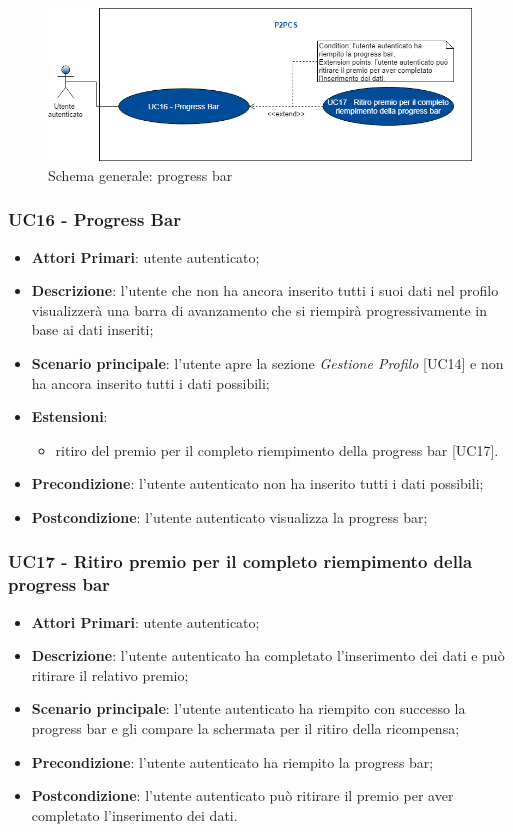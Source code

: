 \begin{figure}[h]
	\includegraphics[width=13cm]{res/images/Schemagenerale7.png}
	\centering
	\caption{Schema generale: progress bar}
\end{figure}
\subsubsection{UC16 - Progress Bar}
\begin{itemize}
	\item \textbf{Attori Primari}: utente autenticato;
	\item \textbf{Descrizione}: l'utente che non ha ancora inserito tutti i suoi dati nel profilo visualizzerà una barra di avanzamento che si riempirà progressivamente in base ai dati inseriti;
	\item \textbf{Scenario principale}: l'utente apre la sezione \textit{Gestione Profilo} [UC14] e non ha ancora inserito tutti i dati possibili;
	\item \textbf{Estensioni}:
	\begin{itemize}
		\item ritiro del premio per il completo riempimento della progress bar [UC17].
	\end{itemize}
	\item \textbf{Precondizione}: l'utente autenticato non ha inserito tutti i dati possibili;
	\item \textbf{Postcondizione}: l'utente autenticato visualizza la progress bar;	
\end{itemize}

\subsubsection{UC17 - Ritiro premio per il completo riempimento della progress bar}
\begin{itemize}
	\item \textbf{Attori Primari}: utente autenticato;
	\item \textbf{Descrizione}: l'utente autenticato ha completato l'inserimento dei dati e può ritirare il relativo premio;	
	\item \textbf{Scenario principale}: l'utente autenticato ha riempito con successo la progress bar e gli compare la schermata per il ritiro della ricompensa;
	\item \textbf{Precondizione}: l'utente autenticato ha riempito la progress bar;
	\item \textbf{Postcondizione}: l'utente autenticato può ritirare il premio per aver completato l'inserimento dei dati.
\end{itemize}
